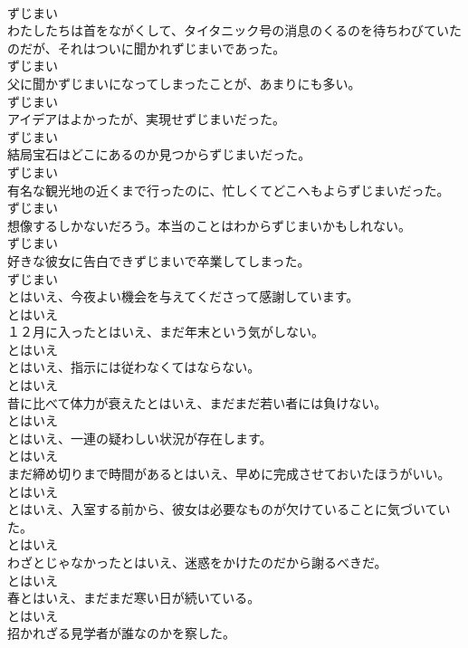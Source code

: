 \documentclass[8pt]{extreport}
\begin{document}
\begin{CJK}{UTF8}{min}
\\	ずじまい
\\	わたしたちは首をながくして、タイタニック号の消息のくるのを待ちわびていたのだが、それはついに聞かれずじまいであった。	
\\	ずじまい
\\	父に聞かずじまいになってしまったことが、あまりにも多い。	
\\	ずじまい
\\	アイデアはよかったが、実現せずじまいだった。	
\\	ずじまい
\\	結局宝石はどこにあるのか見つからずじまいだった。	
\\	ずじまい
\\	有名な観光地の近くまで行ったのに、忙しくてどこへもよらずじまいだった。	
\\	ずじまい
\\	想像するしかないだろう。本当のことはわからずじまいかもしれない。	
\\	ずじまい
\\	好きな彼女に告白できずじまいで卒業してしまった。	
\\	ずじまい
\\	とはいえ、今夜よい機会を与えてくださって感謝しています。	
\\	とはいえ
\\	１２月に入ったとはいえ、まだ年末という気がしない。	
\\	とはいえ
\\	とはいえ、指示には従わなくてはならない。	
\\	とはいえ
\\	昔に比べて体力が衰えたとはいえ、まだまだ若い者には負けない。	
\\	とはいえ
\\	とはいえ、一連の疑わしい状況が存在します。	
\\	とはいえ
\\	まだ締め切りまで時間があるとはいえ、早めに完成させておいたほうがいい。	
\\	とはいえ
\\	とはいえ、入室する前から、彼女は必要なものが欠けていることに気づいていた。	
\\	とはいえ
\\	わざとじゃなかったとはいえ、迷惑をかけたのだから謝るべきだ。	
\\	とはいえ
\\	春とはいえ、まだまだ寒い日が続いている。	
\\	とはいえ
\\	招かれざる見学者が誰なのかを察した。	

\end{CJK}
\end{document}
